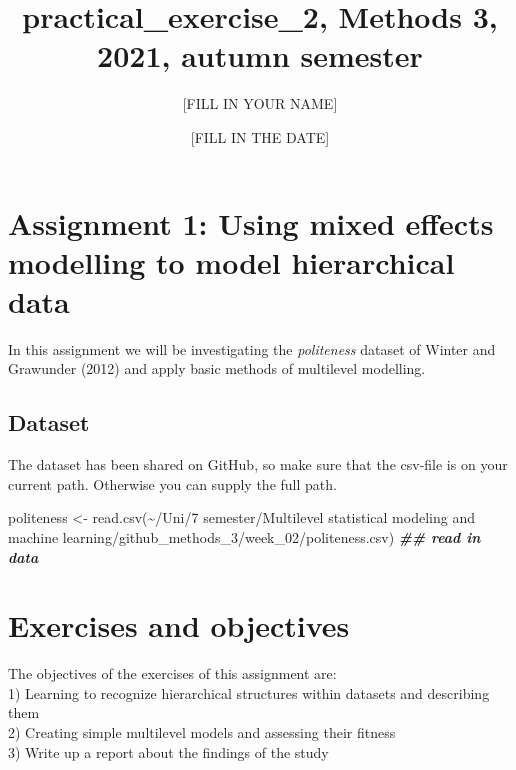 \documentclass[
]{article}
\title{practical\_exercise\_2, Methods 3, 2021, autumn semester}
\author{{[}FILL IN YOUR NAME{]}}
\date{{[}FILL IN THE DATE{]}}
\newenvironment{Shaded}{\begin{snugshade}}{\end{snugshade}}
\newcommand{\DocumentationTok}[1]{\textcolor[rgb]{0.56,0.35,0.01}{\textbf{\textit{#1}}}}
\newcommand{\FunctionTok}[1]{\textcolor[rgb]{0.00,0.00,0.00}{#1}}
\newcommand{\NormalTok}[1]{#1}
\newcommand{\OtherTok}[1]{\textcolor[rgb]{0.56,0.35,0.01}{#1}}
\newcommand{\StringTok}[1]{\textcolor[rgb]{0.31,0.60,0.02}{#1}}
\begin{document}
\maketitle

\hypertarget{assignment-1-using-mixed-effects-modelling-to-model-hierarchical-data}{%
\section{Assignment 1: Using mixed effects modelling to model
hierarchical
data}\label{assignment-1-using-mixed-effects-modelling-to-model-hierarchical-data}}

In this assignment we will be investigating the \emph{politeness}
dataset of Winter and Grawunder (2012) and apply basic methods of
multilevel modelling.

\hypertarget{dataset}{%
\subsection{Dataset}\label{dataset}}

The dataset has been shared on GitHub, so make sure that the csv-file is
on your current path. Otherwise you can supply the full path.

\begin{Shaded}
\begin{Highlighting}[]
\NormalTok{politeness }\OtherTok{\textless{}{-}} \FunctionTok{read.csv}\NormalTok{(}\StringTok{\textquotesingle{}\textasciitilde{}/Uni/7 semester/Multilevel statistical modeling and machine learning/github\_methods\_3/week\_02/politeness.csv\textquotesingle{}}\NormalTok{) }\DocumentationTok{\#\# read in data}
\end{Highlighting}
\end{Shaded}

\hypertarget{exercises-and-objectives}{%
\section{Exercises and objectives}\label{exercises-and-objectives}}

The objectives of the exercises of this assignment are:\\
1) Learning to recognize hierarchical structures within datasets and
describing them\\
2) Creating simple multilevel models and assessing their fitness\\
3) Write up a report about the findings of the study
\end{document}
